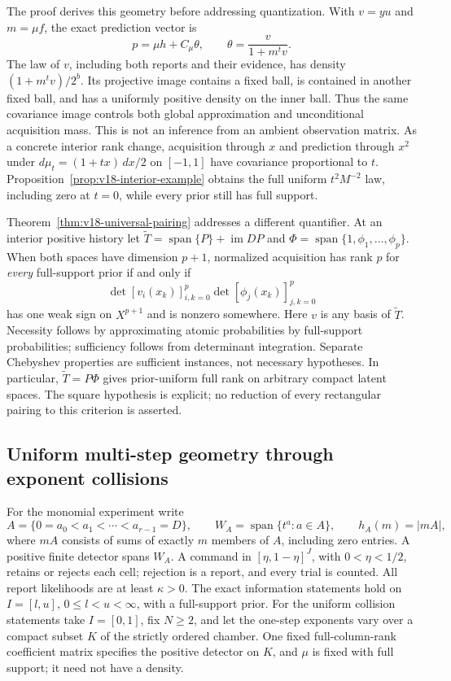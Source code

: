 The proof derives this geometry before addressing quantization. With
$v=yu$ and $m=\mu f$, the exact prediction vector is
\[
 p=\mu h+C_\mu\theta,\qquad
 \theta=\frac{v}{1+m^tv}.
\]
The law of $v$, including both reports and their evidence, has density
$(1+m^tv)/2^b$. Its projective image contains a fixed ball, is contained
in another fixed ball, and has a uniformly positive density on the
inner ball. Thus the same covariance image controls both global
approximation and unconditional acquisition mass. This is not an
inference from an ambient observation matrix. As a concrete interior
rank change, acquisition through $x$ and prediction through $x^2$ under
$d\mu_t=(1+tx)\,dx/2$ on $[-1,1]$ have covariance proportional to
$t$. Proposition~\ref{prop:v18-interior-example} obtains the full
uniform $t^2M^{-2}$ law, including zero at $t=0$, while every prior
still has full support.

Theorem~\ref{thm:v18-universal-pairing} addresses a different
quantifier. At an interior positive history let
$\widetilde T=\operatorname{span}\{P\}+\operatorname{im}DP$ and
$\Phi=\operatorname{span}\{1,\phi_1,\ldots,\phi_p\}$. When both
spaces have dimension $p+1$, normalized acquisition has rank $p$ for
\emph{every} full-support prior if and only if
\[
 \det[v_i(x_k)]_{i,k=0}^p\det[\phi_j(x_k)]_{j,k=0}^p
\]
has one weak sign on $X^{p+1}$ and is nonzero somewhere. Here $v$ is
any basis of $\widetilde T$. Necessity follows by approximating atomic
probabilities by full-support probabilities; sufficiency follows from
determinant integration. Separate Chebyshev properties are sufficient
instances, not necessary hypotheses. In particular,
$\widetilde T=P\Phi$ gives prior-uniform full rank on arbitrary compact
latent spaces. The square hypothesis is explicit; no reduction of every
rectangular pairing to this criterion is asserted.

\subsection{Uniform multi-step geometry through exponent collisions}
For the monomial experiment write
\[
 A=\{0=a_0<a_1<\cdots<a_{r-1}=D\},\qquad
 W_A=\operatorname{span}\{t^a:a\in A\},\qquad h_A(m)=|mA|,
\]
where $mA$ consists of sums of exactly $m$ members of $A$, including
zero entries. A positive finite detector spans $W_A$. A command in
$[\eta,1-\eta]^J$, with $0<\eta<1/2$, retains or rejects each cell;
rejection is a report, and every trial is counted. All report
likelihoods are at least $\kappa>0$. The exact information statements
hold on $I=[l,u]$, $0\le l<u<\infty$, with a full-support prior.
For the uniform collision statements take $I=[0,1]$, fix $N\ge2$,
and let the one-step exponents vary over a compact subset $K$ of the
strictly ordered chamber. One fixed full-column-rank coefficient matrix
specifies the positive detector on $K$, and $\mu$ is fixed with full
support; it need not have a density.

